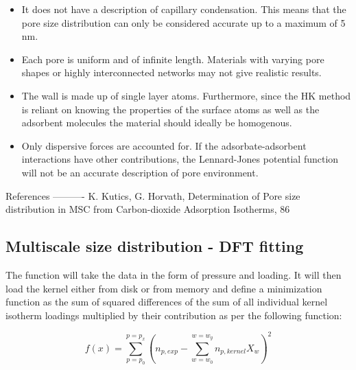 \begin{itemize}
    
    \item It does not have a description of capillary condensation. This means that the
    pore size distribution can only be considered accurate up to a maximum of 5 nm.
    \item Each pore is uniform and of infinite length. Materials with varying pore
    shapes or highly interconnected networks may not give realistic results.
    \item The wall is made up of single layer atoms. Furthermore, since the HK method
    is reliant on knowing the properties of the surface atoms as well as the
    adsorbent molecules the material should ideally be homogenous.
    \item Only dispersive forces are accounted for. If the adsorbate-adsorbent interactions
    have other contributions, the Lennard-Jones potential function will not be
    an accurate description of pore environment.
    
\end{itemize}

References
----------
K. Kutics, G. Horvath, Determination of Pore size distribution in MSC from
Carbon-dioxide Adsorption Isotherms, 86


\subsection{Multiscale size distribution - DFT fitting}

The function will take the data in the form of pressure and loading. It will
then load the kernel either from disk or from memory and define a minimization
function as the sum of squared differences of the sum of all individual kernel
isotherm loadings multiplied by their contribution as per the following function:

\begin{equation}
    f(x) = \sum_{p=p_0}^{p=p_x} (n_{p,exp} - \sum_{w=w_0}^{w=w_y} n_{p, kernel} X_w )^2
\end{equation}